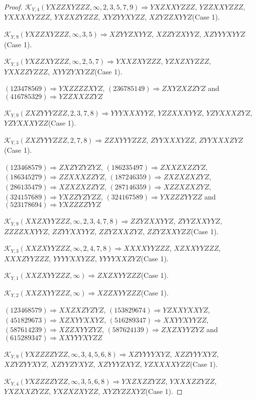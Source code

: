 \documentclass[12pt]{article}
\theoremstyle{plain}
\theoremstyle{definition}
\theoremstyle{remark}
\newcommand{\fancy}[1]{\mathcal{#1}}
\def\K{\fancy{K}}
\begin{document}
\begin{proof}
	
	$\K_{Y,4}(YXZZXYZZZ,\infty,2, 3, 5, 7, 9)\Rightarrow $$YXZXXYZZZ$, $YZZXXYZZZ$, $YXXXXYZZZ$, $YXZXZYZZZ$, $XYZYYXYZZ$, $XZYZZXYYZ$(Case 1).
	
	$\K_{Y,9}(YXZZXYZZZ,\infty,3, 5)\Rightarrow $$XZYYZXYYZ$, $XZZYZXYYZ$, $XZYYYXYYZ$(Case 1).
	
	$\K_{Y,3}(YXZZXYZZZ,\infty,2, 5, 7)\Rightarrow $$YXXZXYZZZ$, $YZXZXYZZZ$, $YXXZZYZZZ$, $XYYZYXYZZ$(Case 1).
	
	
	
	$(1 2 3 4 7 8 5 6 9)\Rightarrow YXZZZZXYZ$, $(2 3 6 7 8 5 1 4 9)\Rightarrow ZXYZXZZYZ$ and $(4 1 6 7 8 5 3 2 9)\Rightarrow YZZXXZZYZ$
	
	
	$\K_{Y,9}(ZXZYYYZZZ,2, 3, 7, 8)\Rightarrow $$YYYXXXYYZ$, $YZZXXXYYZ$, $YZYXXXZYZ$, $YZYXXXYZZ$(Case 1).
	
	$\K_{Y,3}(ZXZYYYZZZ,2, 7, 8)\Rightarrow $$ZZXYYYZZZ$, $ZYYXXXYZZ$, $ZYYXXXZYZ$(Case 1).
	
	
	
	$(1 2 3 4 6 8 5 7 9)\Rightarrow ZXZYZYZYZ$, $(1 8 6 2 3 5 4 9 7)\Rightarrow ZXXZXZZYZ$, $(1 8 6 3 4 5 2 7 9)\Rightarrow ZZXXXZZYZ$, $(1 8 7 2 4 6 3 5 9)\Rightarrow ZXZXZXZYZ$, $(2 8 6 1 3 5 4 7 9)\Rightarrow XZXZXZZYZ$, $(2 8 7 1 4 6 3 5 9)\Rightarrow XZZXZXZYZ$, $(3 2 4 1 5 7 6 8 9)\Rightarrow YXZZYZYZZ$, $(3 2 4 1 6 7 5 8 9)\Rightarrow YXZZZYYZZ$ and $(5 2 3 1 7 8 6 9 4)\Rightarrow YXZZZZYYZ$
	
	
	$\K_{Y,9}(XXZXYYZZZ,\infty,2, 3, 4, 7, 8)\Rightarrow $$ZZYZXXYYZ$, $ZYYZXXYYZ$, $ZZZZXXYYZ$, $ZZYYXXYYZ$, $ZZYZXXZYZ$, $ZZYZXXYZZ$(Case 1).
	
	$\K_{Y,3}(XXZXYYZZZ,\infty,2, 4, 7, 8)\Rightarrow $$XXXXYYZZZ$, $XZXXYYZZZ$, $XXXZYYZZZ$, $YYYYXXYZZ$, $YYYYXXZYZ$(Case 1).
	
	$\K_{Y,1}(XXZXYYZZZ,\infty)\Rightarrow $$ZXZXYYZZZ$(Case 1).
	
	$\K_{Y,2}(XXZXYYZZZ,\infty)\Rightarrow $$XZZXYYZZZ$(Case 1).
	
	
	
	$(1 2 3 4 6 8 5 7 9)\Rightarrow XXZXZYZYZ$, $(1 5 3 8 2 9 6 7 4)\Rightarrow YZXXYXXYZ$, $(4 5 1 8 2 9 6 7 3)\Rightarrow XZXYYXXYZ$, $(5 1 6 2 8 9 3 4 7)\Rightarrow XXYYXYYZZ$, $(5 8 7 6 1 4 2 3 9)\Rightarrow XZZXYYZYZ$, $(5 8 7 6 2 4 1 3 9)\Rightarrow ZXZXYYZYZ$ and $(6 1 5 2 8 9 3 4 7)\Rightarrow XXYYYXYZZ$
	
	
	$\K_{Y,9}(YXZZZZYZZ,\infty,3, 4, 5, 6, 8)\Rightarrow $$XZYYYYXYZ$, $XZZYYYXYZ$, $XZYZYYXYZ$, $XZYYZYXYZ$, $XZYYYZXYZ$, $YZXXXXYZZ$(Case 1).
	
	$\K_{Y,4}(YXZZZZYZZ,\infty,3, 5, 6, 8)\Rightarrow $$YXZXZZYZZ$, $YXXXZZYZZ$, $YXZXXZYZZ$, $YXZXZXYZZ$, $XYZYZZXYZ$(Case 1).
	

\end{proof}
\end{document}
